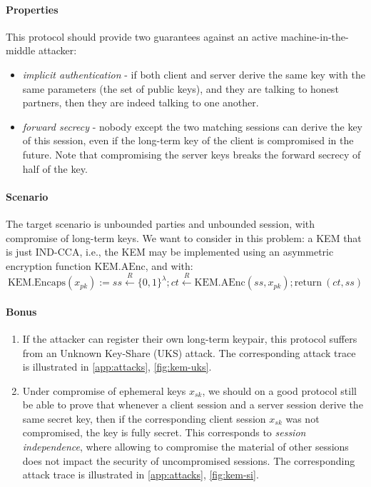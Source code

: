 \documentclass[11pt]{article}
\newcommand{\store}{\leftarrow}
\newcommand{\getR}{\stackrel{R}{\store}}
\newcommand{\sfsk}{\mathit{sk}}
\newcommand{\sfpk}{\mathit{pk}}
\newcommand{\sfss}{\mathit{ss}}
\newcommand{\sfct}{\mathit{ct}}
\newcommand{\kwf}[1]{\mathrm{#1}}
\newcommand{\encaps}{\kwf{KEM.Encaps}}
\newcommand{\aenckem}{\kwf{KEM.AEnc}}
\newcommand{\return}{\kwf{return}}
\begin{document}
\paragraph{Properties} This protocol should provide two guarantees against an active machine-in-the-middle attacker:
\begin{itemize}
\item \emph{implicit authentication} -  if both client and server derive the same key with the same parameters (the set of public keys), and they are talking to honest partners, then they are indeed talking to one another.
\item \emph{forward secrecy} - nobody except the two matching sessions can derive the key of this session, even if the long-term key of the client is compromised in the future. Note that compromising the server keys breaks the forward secrecy of half of the key.
\end{itemize}

\paragraph{Scenario} The target scenario is unbounded parties and unbounded session, with compromise of long-term keys.
We want to consider in this problem: a KEM that is just IND-CCA, i.e., the KEM may be implemented using an asymmetric encryption function $\aenckem$, and with:
$$\encaps(x_\sfpk) := \sfss \getR \{0,1\}^\lambda; \sfct \getR \aenckem(\sfss,x_\sfpk); \return~(\sfct,\sfss)  $$


\paragraph{Bonus}
\begin{enumerate}
\item If the attacker can register their own long-term keypair, this protocol suffers from an Unknown Key-Share (UKS) attack. The corresponding attack trace is illustrated in \cref{app:attacks}, \cref{fig:kem-uks}.
\item  Under compromise of ephemeral keys $x_\sfsk$, we should on a good protocol still be able to prove that whenever a client session and a server session derive the same secret key, then if the corresponding client session $x_\sfsk$ was not compromised, the key is fully secret. This corresponds to \emph{session independence}, where allowing to compromise the material of other sessions does not impact the security of uncompromised sessions.  The corresponding attack trace is illustrated in \cref{app:attacks}, \cref{fig:kem-si}.  
\end{enumerate}
\end{document}

